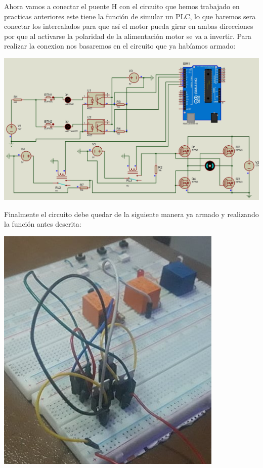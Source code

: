 \documentclass[12pt,a4paper]{article}
\begin{document}
\begin{flushleft}
\begin{center}
\end{center}
\newpage
Ahora vamos a conectar el puente H con el circuito que hemos trabajado en practicas anteriores este tiene la función de simular un PLC, lo que haremos sera conectar los intercalados para que así el motor pueda girar en ambas direcciones por que al activarse la polaridad de la alimentación motor se va a invertir.\linebreak
\linebreak
Para realizar la conexion nos basaremos en el circuito que ya habíamos armado:\linebreak
\begin{center}
\includegraphics[scale=0.2]{imagenes/simu0.JPG}\linebreak
\end{center}
Finalmente el circuito debe quedar de la siguiente manera ya armado y realizando la función antes descrita:\linebreak

\begin{center}
\includegraphics[scale=0.7]{imagenes/fefe0.JPG}\linebreak
\end{center}
\end{flushleft}
\end{document}
